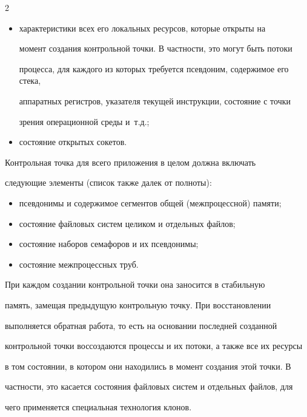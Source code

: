 \begin{multicols}{2}
\begin{itemize}
\item характеристики всех его локальных ресурсов, которые открыты на

момент создания контрольной точки. В частности, это могут быть потоки

процесса, для каждого из которых требуется псевдоним, содержимое его стека,

аппаратных регистров, указателя текущей инструкции, состояние с точки

зрения операционной среды и~т.д.;

\item состояние открытых сокетов.

\end{itemize}



Контрольная точка для всего приложения в целом должна включать

следующие элементы (список также далек от полноты):

\begin{itemize}

\item псевдонимы и содержимое сегментов общей (межпроцессной) памяти;

\item состояние файловых систем целиком и отдельных файлов;

\item состояние наборов семафоров и их псевдонимы;

\item состояние межпроцессных труб.

\end{itemize}



При каждом создании контрольной точки она заносится в стабильную

память, замещая предыду\-щую контрольную точку. При восстановлении

выполняется обратная работа, то есть на основании последней созданной

контрольной точки воссоздаются процессы и их потоки, а также все их ресурсы

в том состоянии, в котором они находились в момент создания этой точки. В

частности, это касается со\-сто\-яния файловых систем и отдельных файлов, для

чего применяется специальная технология клонов.

{ %



}
\end{multicols}
